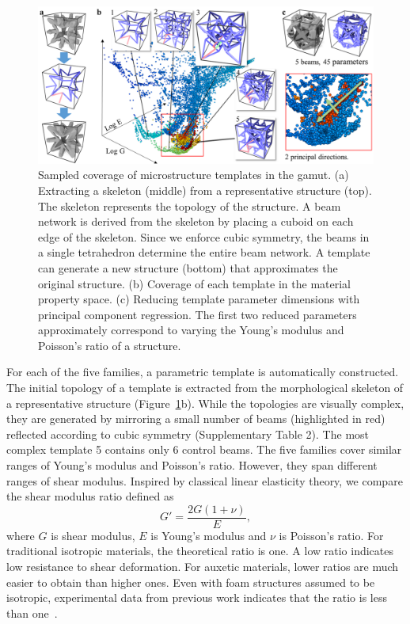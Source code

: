 \begin{figure}
	\includegraphics[width=\columnwidth]{images/mTemplates.png}
	\caption{Sampled coverage of microstructure templates in the gamut. (a) Extracting a skeleton (middle) from a representative structure (top). The skeleton represents the topology of the structure. A beam network is derived from the skeleton by placing a cuboid on each edge of the skeleton. Since we enforce cubic symmetry, the beams in a single tetrahedron determine the entire beam network. A template can generate a new structure (bottom) that approximates the original structure. (b) Coverage of each template in the material property space. (c) Reducing template parameter dimensions with principal component regression. The first two reduced parameters approximately correspond to varying the Young's modulus and Poisson's ratio of a structure. }
	\label{fig:mTemplates}
\end{figure}
For each of the five families, a parametric template is automatically constructed. The initial topology of a template is extracted from the morphological skeleton of a representative structure (Figure~\ref{fig:mTemplates}b). While the topologies are visually complex, they are generated by mirroring a small number of beams (highlighted in red) reflected according to cubic symmetry (Supplementary Table 2). The most complex template 5 contains only 6 control beams. The five families cover similar ranges of Young's modulus and Poisson's ratio. However, they span different ranges of shear modulus. Inspired by classical linear elasticity theory, we compare the shear modulus ratio defined as
\[
G'=\frac{2G(1+\nu)}{E},
\]
where $G$ is shear modulus, $E$ is Young's modulus and $\nu$ is Poisson's ratio. For traditional isotropic materials, the theoretical ratio is one. A low ratio indicates low resistance to shear deformation. For auxetic materials, lower ratios are much easier to obtain than higher ones. Even with foam structures assumed to be isotropic, experimental data from previous work indicates that the ratio is less than one~\citep{roh2013failure}.
